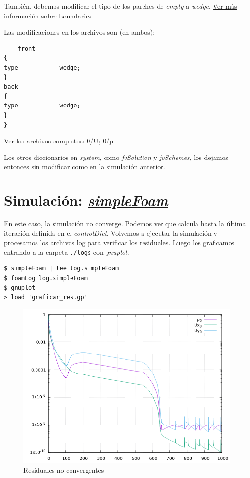 \documentclass{article}
\begin{document}
También, debemos modificar el tipo de los parches de \textit{empty} a \textit{wedge}. \href{https://www.openfoam.com/documentation/user-guide/boundaries.php}{Ver más información sobre boundaries}

Las modificaciones en los archivos son (en ambos):
\begin{lstlisting}
    front
{
type            wedge;
}
back
{
type            wedge;
}
}
\end{lstlisting}

\noindent Ver los archivos completos: 
\href{https://github.com/guillerolle/casos_cfd/tree/master/02/0/U}{0/U};
\href{https://github.com/guillerolle/casos_cfd/tree/master/02/0/p}{0/p}

\bigskip
Los otros diccionarios en \textit{system}, como \textit{fvSolution} y \textit{fvSchemes}, los dejamos entonces sin modificar como en la simulación anterior.

\section{Simulación: \textit{\href{https://openfoamwiki.net/index.php/SimpleFoam}{simpleFoam}}}
En este caso, la simulación no converge. Podemos ver que calcula hasta la última iteración definida en el \textit{controlDict}.
Volvemos a ejecutar la simulación y procesamos los archivos log para verificar los residuales. Luego los graficamos entrando a la carpeta \texttt{./logs} con \textit{gnuplot}.

\begin{lstlisting}
$ simpleFoam | tee log.simpleFoam
$ foamLog log.simpleFoam
$ gnuplot 
> load 'graficar_res.gp'
\end{lstlisting}

\begin{figure}[h!]
	\centering
	\includegraphics[width=1\textwidth]{Figuras/04_residuales_noconv.png}
	\caption{Residuales no convergentes}
	\label{fig:resid_noconv}
\end{figure}
\end{document}
